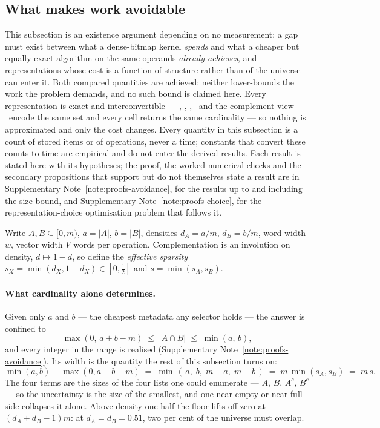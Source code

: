 \subsection*{What makes work avoidable}

This subsection is an existence argument depending on no measurement: a gap must exist between what
a dense-bitmap kernel \emph{spends} and what a cheaper but equally exact algorithm on the same
operands \emph{already achieves}, and representations whose cost is a function of structure rather
than of the universe can enter it. Both compared quantities are achieved; neither lower-bounds the
work the problem demands, and no such bound is claimed here. Every representation is exact and
interconvertible --- \rB, \rS, \rR, \rW\ and the complement view \rC\ encode the same set and every
cell returns the same cardinality --- so nothing is approximated and only the cost changes. Every
quantity in this subsection is a count of stored items or of operations, never a time; constants that convert
these counts to time are empirical and do not enter the derived results. Each result is stated here with its hypotheses; the proof, the worked
numerical checks and the secondary propositions that support but do not themselves state a result are
in Supplementary Note~\ref{note:proofs-avoidance}, for the results up to and including the size bound, and Supplementary Note~\ref{note:proofs-choice}, for the representation-choice optimisation problem that follows it.

Write $A,B \subseteq [0,m)$, $a=|A|$, $b=|B|$, densities $d_A=a/m$, $d_B=b/m$, word width $w$, vector
width $V$ words per operation. Complementation is an involution on density, $d\mapsto 1-d$, so define
the \emph{effective sparsity} $s_X=\min(d_X,1-d_X)\in[0,\tfrac12]$ and $s=\min(s_A,s_B)$.

\paragraph*{What cardinality alone determines.}
Given only $a$ and $b$ --- the cheapest metadata any selector holds --- the answer is confined to
\begin{equation}
\max(0,\,a+b-m) \;\le\; |A \cap B| \;\le\; \min(a,\,b),
\label{eq:interval}
\end{equation}
and every integer in the range is realised (Supplementary Note~\ref{note:proofs-avoidance}). Its width is the quantity the rest
of this subsection turns on:
\begin{equation}
\min(a,b)-\max(0,a+b-m) \;=\; \min\,(\,a,\;b,\;m-a,\;m-b\,) \;=\; m\,\min(s_A,s_B) \;=\; m\,s .
\label{eq:width}
\end{equation}
The four terms are the sizes of the four lists one could enumerate --- $A$, $B$, $A^{c}$, $B^{c}$ ---
so the uncertainty is the size of the smallest, and one near-empty or near-full side collapses it
alone. Above density one half the floor lifts off zero at $(d_A+d_B-1)m$: at $d_A=d_B=0.51$, two per
cent of the universe must overlap.

